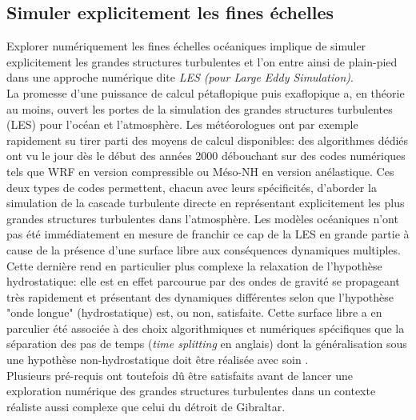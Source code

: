 \subsection{Simuler explicitement les fines échelles}
\color{blue}
Explorer numériquement les fines échelles océaniques implique de simuler explicitement les grandes structures turbulentes et l'on entre ainsi de plain-pied dans une approche numérique dite \textit{LES (pour \textit{Large Eddy Simulation})}.\\
La promesse d’une puissance de calcul pétaflopique puis exaflopique a, en théorie au moins, ouvert les portes de la simulation des grandes structures turbulentes (LES) pour l’océan et l’atmosphère. Les météorologues ont par exemple rapidement su tirer parti des moyens de calcul disponibles: des algorithmes dédiés ont vu le jour dès le début des années 2000 débouchant sur des codes numériques tels que WRF \citep{skamarock_prototypes_2001} en version compressible ou Méso-NH \citep{lac_overview_2018} en version anélastique. Ces deux types de codes permettent, chacun avec leurs spécificités, d’aborder la simulation de la cascade turbulente directe en représentant explicitement les plus grandes structures turbulentes dans l’atmosphère.
Les modèles océaniques n’ont pas été immédiatement en mesure de franchir ce cap de la LES en grande partie à cause de la présence d’une surface libre aux conséquences dynamiques multiples. Cette dernière rend en particulier plus complexe la relaxation de l’hypothèse hydrostatique: elle est en effet parcourue par des ondes de gravité se propageant très rapidement et présentant des dynamiques différentes selon que l'hypothèse "onde longue" (hydrostatique) est, ou non, satisfaite. Cette surface libre a en parculier été associée à des choix algorithmiques et numériques spécifiques que la séparation des pas de temps (\textit{time splitting} en anglais) dont la généralisation sous une hypothèse non-hydrostatique doit être réalisée avec soin \citep{auclair_non-hydrostatic_2011,Auclair2018}.\\
Plusieurs pré-requis ont toutefois dû être satisfaits avant de lancer une exploration numérique des grandes structures turbulentes dans un contexte réaliste aussi complexe que celui du détroit de Gibraltar.

